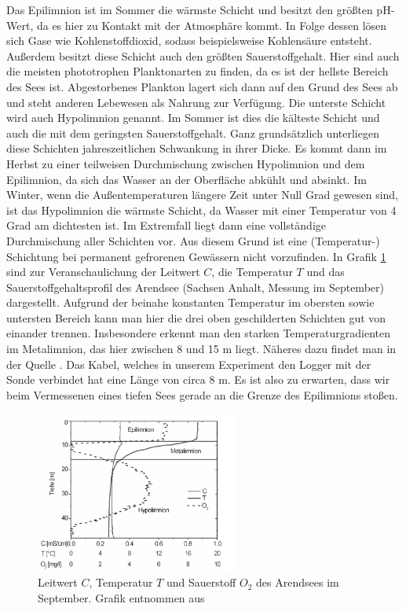 \documentclass[12pt,a4paper,titlepage,headinclude,bibtotoc]{scrartcl}
\numberwithin{equation}{subsection}
\begin{document}
Das Epilimnion ist im Sommer die wärmste Schicht und besitzt den größten pH-Wert, da es hier zu Kontakt mit der Atmosphäre kommt.
In Folge dessen lösen sich Gase wie Kohlenstoffdioxid, sodass beispielsweise Kohlensäure entsteht.
Außerdem besitzt diese Schicht auch den größten Sauerstoffgehalt.
Hier sind auch die meisten phototrophen Planktonarten zu finden, da es ist der hellste Bereich des Sees ist.
Abgestorbenes Plankton lagert sich dann auf den Grund des Sees ab und steht anderen Lebewesen als Nahrung zur Verfügung.
\newline
Die unterste Schicht wird auch Hypolimnion genannt.
Im Sommer ist dies die kälteste Schicht und auch die mit dem geringsten Sauerstoffgehalt. 
Ganz grundsätzlich unterliegen diese Schichten jahreszeitlichen Schwankung in ihrer Dicke.
Es kommt dann im Herbst zu einer teilweisen Durchmischung zwischen Hypolimnion und dem Epilimnion, da sich das Wasser an der Oberfläche abkühlt und absinkt.
Im Winter, wenn die Außentemperaturen längere Zeit unter Null Grad gewesen sind, ist das Hypolimnion die wärmste Schicht, da Wasser mit einer Temperatur von 4 Grad am dichtesten ist. 
Im Extremfall liegt dann eine vollständige Durchmischung aller Schichten vor.
Aus diesem Grund ist eine (Temperatur-) Schichtung bei permanent gefrorenen Gewässern nicht vorzufinden.
\newline
In Grafik \ref{fig:schichtung} sind zur Veranschaulichung der Leitwert $C$, die Temperatur $T$ und das Sauerstoffgehaltsprofil des Arendsee (Sachsen Anhalt, Messung im September) dargestellt. 
Aufgrund der beinahe konstanten Temperatur im obersten sowie untersten Bereich kann man hier die drei oben geschilderten Schichten gut von einander trennen.
Insbesondere erkennt man den starken Temperaturgradienten im Metalimnion, das hier zwischen 8 und 15 m liegt. 
Näheres dazu findet man in der Quelle \cite{schicht}.
Das Kabel, welches in unserem Experiment den Logger mit der Sonde verbindet hat eine Länge von circa 8 m.
Es ist also zu erwarten, dass wir beim Vermessenen eines tiefen Sees gerade an die Grenze des Epilimnions stoßen.


\begin{figure}[h]
	\centering
	\includegraphics[width=0.6\textwidth]{schicht.png}
	\caption{Leitwert $C$, Temperatur $T$ und Sauerstoff $O_2$ des Arendsees im September. Grafik entnommen aus \cite{schicht} }
	\label{fig:schichtung}
\end{figure}
\end{document}
